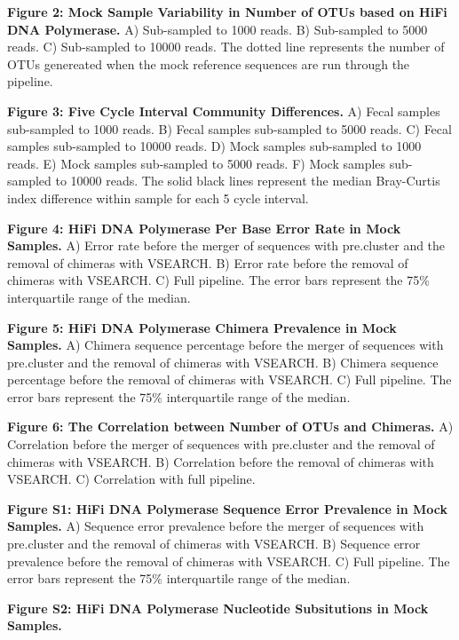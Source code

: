 \documentclass[12pt,]{article}
\begin{document}
\textbf{Figure 2: Mock Sample Variability in Number of OTUs based on
HiFi DNA Polymerase.} A) Sub-sampled to 1000 reads. B) Sub-sampled to
5000 reads. C) Sub-sampled to 10000 reads. The dotted line represents
the number of OTUs genereated when the mock reference sequences are run
through the pipeline.

\textbf{Figure 3: Five Cycle Interval Community Differences.} A) Fecal
samples sub-sampled to 1000 reads. B) Fecal samples sub-sampled to 5000
reads. C) Fecal samples sub-sampled to 10000 reads. D) Mock samples
sub-sampled to 1000 reads. E) Mock samples sub-sampled to 5000 reads. F)
Mock samples sub-sampled to 10000 reads. The solid black lines represent
the median Bray-Curtis index difference within sample for each 5 cycle
interval.

\textbf{Figure 4: HiFi DNA Polymerase Per Base Error Rate in Mock
Samples.} A) Error rate before the merger of sequences with pre.cluster
and the removal of chimeras with VSEARCH. B) Error rate before the
removal of chimeras with VSEARCH. C) Full pipeline. The error bars
represent the 75\% interquartile range of the median.

\textbf{Figure 5: HiFi DNA Polymerase Chimera Prevalence in Mock
Samples.} A) Chimera sequence percentage before the merger of sequences
with pre.cluster and the removal of chimeras with VSEARCH. B) Chimera
sequence percentage before the removal of chimeras with VSEARCH. C) Full
pipeline. The error bars represent the 75\% interquartile range of the
median.

\textbf{Figure 6: The Correlation between Number of OTUs and Chimeras.}
A) Correlation before the merger of sequences with pre.cluster and the
removal of chimeras with VSEARCH. B) Correlation before the removal of
chimeras with VSEARCH. C) Correlation with full pipeline.

\newpage

\textbf{Figure S1: HiFi DNA Polymerase Sequence Error Prevalence in Mock
Samples.} A) Sequence error prevalence before the merger of sequences
with pre.cluster and the removal of chimeras with VSEARCH. B) Sequence
error prevalence before the removal of chimeras with VSEARCH. C) Full
pipeline. The error bars represent the 75\% interquartile range of the
median.

\textbf{Figure S2: HiFi DNA Polymerase Nucleotide Subsitutions in Mock
Samples.}
\end{document}

